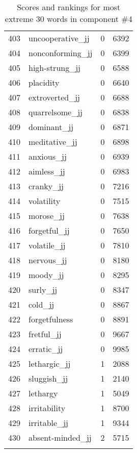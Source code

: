 \begin{longtable}[!htbp]{| rlr@{.}l |}
    403 & uncooperative\_jj & 0 & 6392 \\
    404 & nonconforming\_jj & 0 & 6399 \\
    405 & high-strung\_jj & 0 & 6588 \\
    406 & placidity & 0 & 6640 \\
    407 & extroverted\_jj & 0 & 6688 \\
    408 & quarrelsome\_jj & 0 & 6838 \\
    409 & dominant\_jj & 0 & 6871 \\
    410 & meditative\_jj & 0 & 6898 \\
    411 & anxious\_jj & 0 & 6939 \\
    412 & aimless\_jj & 0 & 6983 \\
    413 & cranky\_jj & 0 & 7216 \\
    414 & volatility & 0 & 7515 \\
    415 & morose\_jj & 0 & 7638 \\
    416 & forgetful\_jj & 0 & 7650 \\
    417 & volatile\_jj & 0 & 7810 \\
    418 & nervous\_jj & 0 & 8180 \\
    419 & moody\_jj & 0 & 8295 \\
    420 & surly\_jj & 0 & 8347 \\
    421 & cold\_jj & 0 & 8867 \\
    422 & forgetfulness & 0 & 8891 \\
    423 & fretful\_jj & 0 & 9667 \\
    424 & erratic\_jj & 0 & 9985 \\
    425 & lethargic\_jj & 1 & 2088 \\
    426 & sluggish\_jj & 1 & 2140 \\
    427 & lethargy & 1 & 5049 \\
    428 & irritability & 1 & 8700 \\
    429 & irritable\_jj & 1 & 9344 \\
    430 & absent-minded\_jj & 2 & 5715 \\
    \hline
    \caption{Scores and rankings for most extreme 30 words in component \#4} \\
\end{longtable}
